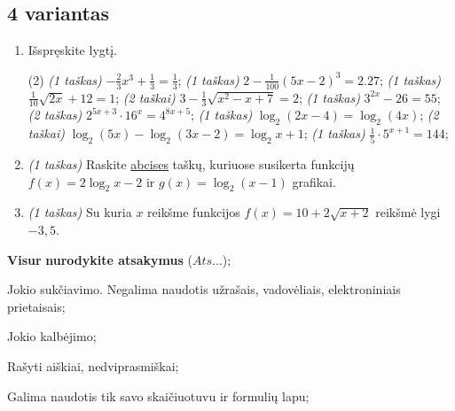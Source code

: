 \documentclass[a4paper]{article}
\begin{document}
\vspace*{12mm}


\subsection*{4 variantas}

\begin{enumerate}
      \item Išspręskite lygtį.
            \begin{tasks}[item-format={\normalfont}, after-item-skip=2mm](2)
                  \task \textit{(1 taškas)} $-\frac{2}{3}x^3+\frac{1}{3}=\frac{1}{3}$;
                  \task \textit{(1 taškas)} $2-\frac{1}{100}\left(5x-2\right)^3=2.27$;
                  \task \textit{(1 taškas)} $\frac{1}{10}\sqrt{2x}+12=1$;
                  \task \textit{(2 taškai)} $3-\frac{1}{3}\sqrt{x^2-x+7}=2$;
                  \task \textit{(1 taškas)} $3^{2x}-26=55$;
                  \task \textit{(2 taškas)} $2^{5x+3}\cdot16^{x}=4^{8x+5}$;
                  \task \textit{(1 taškas)} $\log_2(2x-4)=\log_2(4x)$;
                  \task \textit{(2 taškai)} $\log_2(5x)-\log_2(3x-2)=\log_2x+1$;
                  \task \textit{(1 taškas)} $\frac{1}{5}\cdot 5^{x+1}=144$;
            \end{tasks}

      \item \textit{(1 taškas)} Raskite \underline{abcises} taškų, kuriuose susikerta funkcijų $f(x)=2\log _2x-2$ ir $g(x)=\log _2\left(x-1\right)$ grafikai.
      \item \textit{(1 taškas)} Su kuria $x$ reikšme funkcijos $f(x)=10+2\sqrt{x+2}$ reikšmė lygi $-3,5$.
\end{enumerate}


\begin{small}
      \begin{enumerate*}[label={(\arabic*)}]
            \item \textbf{Visur} \textbf{nurodykite atsakymus} ($Ats\ldots$);
            \item Jokio sukčiavimo. Negalima naudotis užrašais, vadovėliais,
            elektroniniais prietaisais;
            \item Jokio kalbėjimo;
            \item Rašyti aiškiai, nedviprasmiškai;
            \item Galima naudotis tik savo skaičiuotuvu ir formulių lapu;
      \end{enumerate*}
\end{small}
\end{document}
